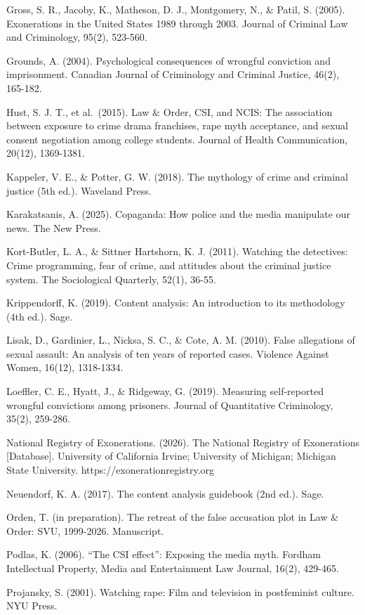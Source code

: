 \documentclass[
]{article}
\begin{document}
Gross, S. R., Jacoby, K., Matheson, D. J., Montgomery, N., \& Patil, S.
(2005). Exonerations in the United States 1989 through 2003. Journal of
Criminal Law and Criminology, 95(2), 523-560.

Grounds, A. (2004). Psychological consequences of wrongful conviction
and imprisonment. Canadian Journal of Criminology and Criminal Justice,
46(2), 165-182.

Hust, S. J. T., et al.~(2015). Law \& Order, CSI, and NCIS: The
association between exposure to crime drama franchises, rape myth
acceptance, and sexual consent negotiation among college students.
Journal of Health Communication, 20(12), 1369-1381.

Kappeler, V. E., \& Potter, G. W. (2018). The mythology of crime and
criminal justice (5th ed.). Waveland Press.

Karakatsanis, A. (2025). Copaganda: How police and the media manipulate
our news. The New Press.

Kort-Butler, L. A., \& Sittner Hartshorn, K. J. (2011). Watching the
detectives: Crime programming, fear of crime, and attitudes about the
criminal justice system. The Sociological Quarterly, 52(1), 36-55.

Krippendorff, K. (2019). Content analysis: An introduction to its
methodology (4th ed.). Sage.

Lisak, D., Gardinier, L., Nicksa, S. C., \& Cote, A. M. (2010). False
allegations of sexual assault: An analysis of ten years of reported
cases. Violence Against Women, 16(12), 1318-1334.

Loeffler, C. E., Hyatt, J., \& Ridgeway, G. (2019). Measuring
self-reported wrongful convictions among prisoners. Journal of
Quantitative Criminology, 35(2), 259-286.

National Registry of Exonerations. (2026). The National Registry of
Exonerations {[}Database{]}. University of California Irvine; University
of Michigan; Michigan State University. https://exonerationregistry.org

Neuendorf, K. A. (2017). The content analysis guidebook (2nd ed.). Sage.

Orden, T. (in preparation). The retreat of the false accusation plot in
Law \& Order: SVU, 1999-2026. Manuscript.

Podlas, K. (2006). ``The CSI effect'': Exposing the media myth. Fordham
Intellectual Property, Media and Entertainment Law Journal, 16(2),
429-465.

Projansky, S. (2001). Watching rape: Film and television in postfeminist
culture. NYU Press.
\end{document}
